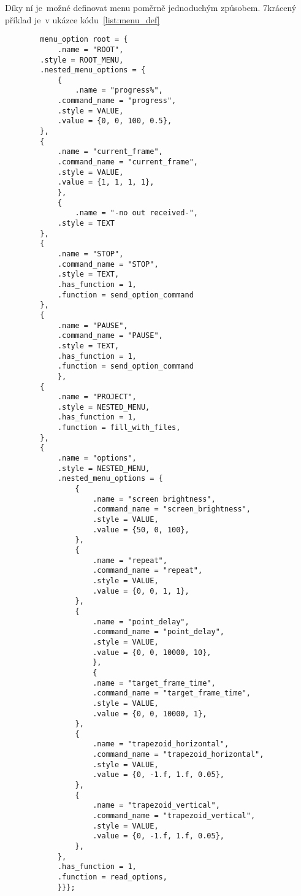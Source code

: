 Díky ní je~možné definovat menu poměrně jednoduchým způsobem. 7krácený příklad je~v ukázce kódu~\ref{list:menu_def}
\begin{code}
    \begin{verbatim}
        menu_option root = {
            .name = "ROOT",
        .style = ROOT_MENU,
        .nested_menu_options = {
            {
                .name = "progress%",
            .command_name = "progress",
            .style = VALUE,
            .value = {0, 0, 100, 0.5},
        },
        {
            .name = "current_frame",
            .command_name = "current_frame",
            .style = VALUE,
            .value = {1, 1, 1, 1},
            },
            {
                .name = "-no out received-",
            .style = TEXT
        },
        {
            .name = "STOP",
            .command_name = "STOP",
            .style = TEXT,
            .has_function = 1,
            .function = send_option_command
        },
        {
            .name = "PAUSE",
            .command_name = "PAUSE",
            .style = TEXT,
            .has_function = 1,
            .function = send_option_command
            },
        {
            .name = "PROJECT",
            .style = NESTED_MENU,
            .has_function = 1,
            .function = fill_with_files,
        },
        {
            .name = "options",
            .style = NESTED_MENU,
            .nested_menu_options = {
                {
                    .name = "screen brightness",
                    .command_name = "screen_brightness",
                    .style = VALUE,
                    .value = {50, 0, 100},
                },
                {
                    .name = "repeat",
                    .command_name = "repeat",
                    .style = VALUE,
                    .value = {0, 0, 1, 1},
                },
                {
                    .name = "point_delay",
                    .command_name = "point_delay",
                    .style = VALUE,
                    .value = {0, 0, 10000, 10},
                    },
                    {
                    .name = "target_frame_time",
                    .command_name = "target_frame_time",
                    .style = VALUE,
                    .value = {0, 0, 10000, 1},
                },
                {
                    .name = "trapezoid_horizontal",
                    .command_name = "trapezoid_horizontal",
                    .style = VALUE,
                    .value = {0, -1.f, 1.f, 0.05},
                },
                {
                    .name = "trapezoid_vertical",
                    .command_name = "trapezoid_vertical",
                    .style = VALUE,
                    .value = {0, -1.f, 1.f, 0.05},
                },
            },
            .has_function = 1,
            .function = read_options,
            }}};
        \end{verbatim}
    \end{code}
        
